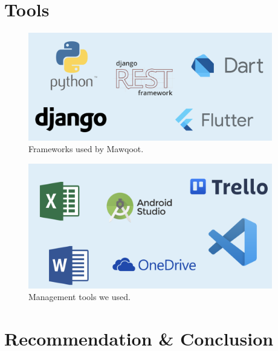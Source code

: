\documentclass{loyola-beamer}
\begin{document}
\section{Tools}

\begin{frame}
	\begin{figure}
		\begin{center}
			\includegraphics[width=0.95\textwidth]{figures/frameworks.png}
		\end{center}
		\caption{Frameworks used by Mawqoot.}
	\end{figure}
\end{frame}

\begin{frame}
	\begin{figure}
		\begin{center}
			\includegraphics[width=0.95\textwidth]{figures/tools-mng.png}
		\end{center}
		\caption{Management tools we used.}
	\end{figure}
\end{frame}

\section{Recommendation \& Conclusion}
\end{document}
